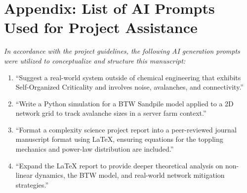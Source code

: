 \documentclass[12pt,a4paper]{article}
\begin{document}
\section*{Appendix: List of AI Prompts Used for Project Assistance}
\textit{In accordance with the project guidelines, the following AI generation prompts were utilized to conceptualize and structure this manuscript:}
\begin{enumerate}
    \item ``Suggest a real-world system outside of chemical engineering that exhibits Self-Organized Criticality and involves noise, avalanches, and connectivity.''
    \item ``Write a Python simulation for a BTW Sandpile model applied to a 2D network grid to track avalanche sizes in a server farm context.''
    \item ``Format a complexity science project report into a peer-reviewed journal manuscript format using LaTeX, ensuring equations for the toppling mechanics and power-law distribution are included.''
    \item ``Expand the LaTeX report to provide deeper theoretical analysis on non-linear dynamics, the BTW model, and real-world network mitigation strategies.''
\end{enumerate}
\end{document}

